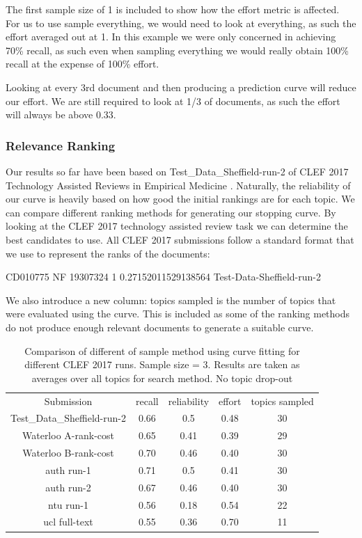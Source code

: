 The first sample size of 1 is included to show how the effort metric is affected. For us to use sample everything, we would need to look at everything, as such the effort averaged out at 1. In this example we were only concerned in achieving 70\% recall, as such even when sampling everything we would really obtain 100\% recall at the expense of 100\% effort.

Looking at every 3rd document and then producing a prediction curve will reduce our effort. We are still required to look at 1/3 of documents, as such the effort will always be above 0.33. 

\subsubsection{Relevance Ranking}

Our results so far have been based on Test\_Data\_Sheffield-run-2 \cite{Alharbi2017} of CLEF 2017 Technology Assisted Reviews in Empirical Medicine \cite{CLEFLINK}. Naturally, the reliability of our curve is heavily based on how good the initial rankings are for each topic. We can compare different ranking methods for generating our stopping curve. By looking at the CLEF 2017 technology assisted review task \cite{Kanoulas12017} we can determine the best candidates to use. All CLEF 2017 submissions follow a standard format that we use to represent the ranks of the documents:

\begin{tcolorbox}
CD010775 NF 19307324 1 0.27152011529138564 Test-Data-Sheffield-run-2 
\end{tcolorbox}


We also introduce a new column: topics sampled is the number of topics that were evaluated using the curve. This is included as some of the ranking methods do not produce enough relevant documents to generate a suitable curve. 

\begin{table}[H]
\centering
\begin{tabular}{|c|c|c|c|c|} 

 \hline
 Submission & recall & reliability & effort & topics sampled  \\ 
 Test\_Data\_Sheffield-run-2 & 0.66 &	0.5	&	0.48 & 30 \\ 
 Waterloo A-rank-cost & 0.65 & 0.41	&	0.39 & 29 \\ 
 Waterloo B-rank-cost & 0.70 & 0.46	&	0.40 & 30 \\ 
 auth run-1 & 0.71 & 0.5	&	0.41 & 30 \\ 
 auth run-2 & 0.67 & 0.46	&	0.40 & 30 \\ 
 ntu run-1 & 0.56 & 0.18	&	0.54 & 22 \\ 
 ucl full-text & 0.55 & 0.36	&	0.70 & 11 \\ 
 \hline
\end{tabular}
\caption{Comparison of different of sample method using curve fitting for different CLEF 2017 runs. Sample size = 3. Results are taken as averages over all topics for search method. No topic drop-out}

\end{table}


